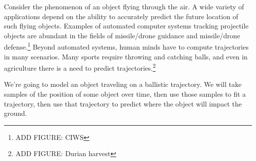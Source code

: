Consider the phenomenon of an object flying through the air. A wide variety of applications depend on the ability to accurately predict the future location of such flying objects. Examples of automated computer systems tracking projectile objects are abundant in the fields of missile/drone guidance and missile/drone defense.\footnote{ADD FIGURE: CIWS} Beyond automated systems, human minds have to compute trajectories in many scenarios. Many sports require throwing and catching balls, and even in agriculture there is a need to predict trajectories.\footnote{ADD FIGURE: Durian harvest}

We're going to model an object traveling on a ballistic trajectory. We will take samples of the position of some object over time, then use those samples to fit a trajectory, then use that trajectory to predict where the object will impact the ground.

